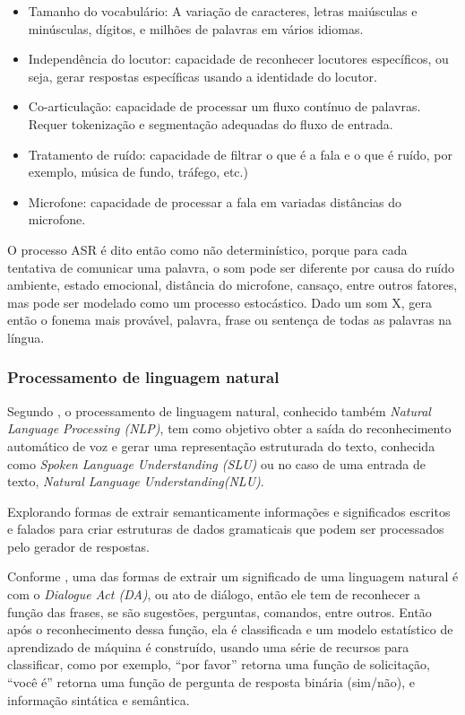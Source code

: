 \documentclass[
	12pt,				%
	oneside,
	a4paper,			%
	english,			%
	french,				%
	spanish,			%
	brazil				%
	]{abntex2}
\begin{document}
\begin{itemize}
	\item Tamanho do vocabulário: A variação de caracteres, letras maiúsculas e minúsculas, dígitos, e milhões de palavras em vários idiomas.
	\item Independência do locutor: capacidade de reconhecer locutores específicos, ou seja, gerar respostas específicas usando a identidade do locutor.
	\item Co-articulação: capacidade de processar um fluxo contínuo de palavras. Requer tokenização e segmentação adequadas do fluxo de entrada.
	\item Tratamento de ruído: capacidade de filtrar o que é a fala e o que é ruído, por exemplo, música de fundo, tráfego, etc.)
	\item Microfone: capacidade de processar a fala em variadas distâncias do microfone.
\end{itemize}

O processo ASR é dito então como não determinístico, porque para cada tentativa de comunicar uma palavra, o som pode ser diferente por causa do ruído ambiente, estado emocional, distância do microfone, cansaço, entre outros fatores, mas pode ser modelado como um processo estocástico. Dado um som X, gera então o fonema mais provável, palavra, frase ou sentença de todas as palavras na língua.

\subsubsection{Processamento de linguagem natural}
Segundo \textcite{spoken-language-understan.}, o processamento de linguagem natural, conhecido também \emph{Natural Language Processing (NLP)}, tem como objetivo obter a saída do reconhecimento automático de voz e gerar uma representação estruturada do texto, conhecida como \emph{Spoken Language Understanding (SLU)} ou no caso de uma entrada de texto, \emph{Natural Language Understanding(NLU)}.

Explorando formas de extrair semanticamente informações e significados escritos e falados para criar estruturas de dados gramaticais que podem ser processados pelo gerador de respostas.

Conforme \textcite{conversational-interface}, uma das formas de extrair um significado de uma linguagem natural é com o \emph{Dialogue Act (DA)}, ou ato de diálogo, então ele tem de reconhecer a função das frases, se são sugestões, perguntas, comandos, entre outros. Então após o reconhecimento dessa função, ela é classificada e um modelo estatístico de aprendizado de máquina é construído, usando uma série de recursos para classificar, como por exemplo, “por favor” retorna uma função de solicitação, “você é” retorna uma função de pergunta de resposta binária (sim/não), e informação sintática e semântica.
\end{document}
